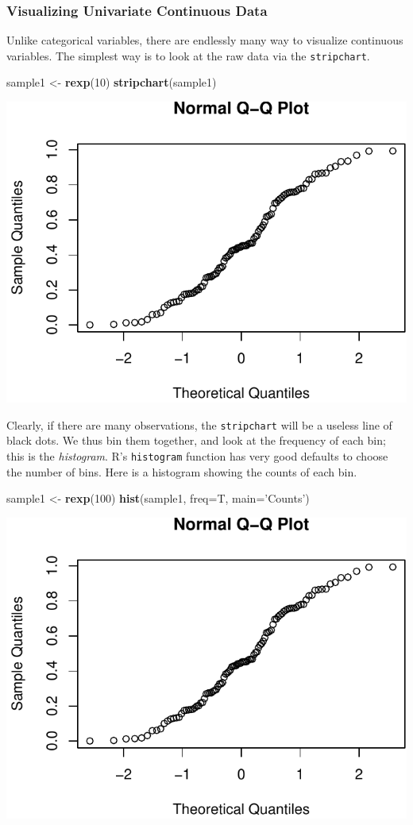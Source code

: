 \documentclass[]{book}
\newenvironment{Shaded}{\begin{snugshade}}{\end{snugshade}}
\newcommand{\KeywordTok}[1]{\textcolor[rgb]{0.13,0.29,0.53}{\textbf{#1}}}
\newcommand{\DataTypeTok}[1]{\textcolor[rgb]{0.13,0.29,0.53}{#1}}
\newcommand{\DecValTok}[1]{\textcolor[rgb]{0.00,0.00,0.81}{#1}}
\newcommand{\StringTok}[1]{\textcolor[rgb]{0.31,0.60,0.02}{#1}}
\newcommand{\NormalTok}[1]{#1}
\theoremstyle{definition}
\theoremstyle{definition}
\theoremstyle{definition}
\theoremstyle{remark}
\begin{document}
\subsubsection{Visualizing Univariate Continuous
Data}\label{visualizing-univariate-continuous-data}

Unlike categorical variables, there are endlessly many way to visualize
continuous variables. The simplest way is to look at the raw data via
the \texttt{stripchart}.

\begin{Shaded}
\begin{Highlighting}[]
\NormalTok{sample1 <-}\StringTok{ }\KeywordTok{rexp}\NormalTok{(}\DecValTok{10}\NormalTok{)                             }
\KeywordTok{stripchart}\NormalTok{(sample1)}
\end{Highlighting}
\end{Shaded}

\includegraphics[width=0.5\linewidth]{Rcourse_files/figure-latex/unnamed-chunk-115-1}

Clearly, if there are many observations, the \texttt{stripchart} will be
a useless line of black dots. We thus bin them together, and look at the
frequency of each bin; this is the \emph{histogram}. R's
\texttt{histogram} function has very good defaults to choose the number
of bins. Here is a histogram showing the counts of each bin.

\begin{Shaded}
\begin{Highlighting}[]
\NormalTok{sample1 <-}\StringTok{ }\KeywordTok{rexp}\NormalTok{(}\DecValTok{100}\NormalTok{)                            }
\KeywordTok{hist}\NormalTok{(sample1, }\DataTypeTok{freq=}\NormalTok{T, }\DataTypeTok{main=}\StringTok{'Counts'}\NormalTok{)        }
\end{Highlighting}
\end{Shaded}

\includegraphics[width=0.5\linewidth]{Rcourse_files/figure-latex/unnamed-chunk-116-1}
\end{document}
